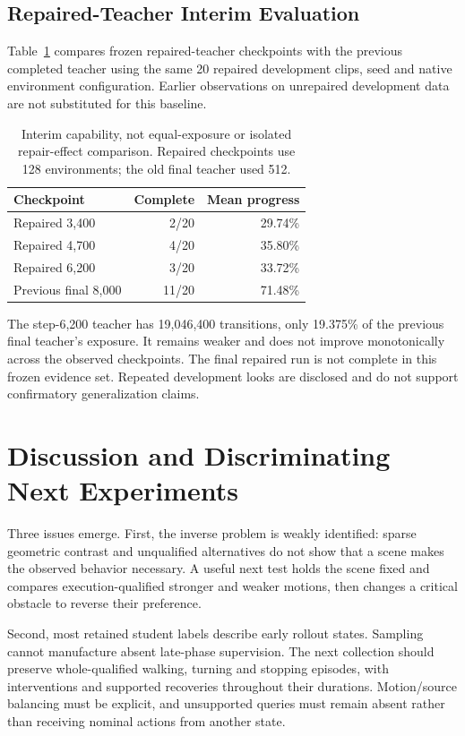 \documentclass[10pt,twocolumn]{article}
\begin{document}
\subsection{Repaired-Teacher Interim Evaluation}
Table~\ref{tab:teacher} compares frozen repaired-teacher checkpoints with the previous completed teacher using the same 20 repaired development clips, seed and native environment configuration. Earlier observations on unrepaired development data are not substituted for this baseline.
\begin{table}[t]
\centering\small
\begin{tabular}{lrr}\toprule
Checkpoint & Complete & Mean progress\\\midrule
Repaired 3,400 & 2/20 & 29.74\%\\
Repaired 4,700 & 4/20 & 35.80\%\\
Repaired 6,200 & 3/20 & 33.72\%\\
Previous final 8,000 & 11/20 & 71.48\%\\\bottomrule
\end{tabular}
\caption{Interim capability, not equal-exposure or isolated repair-effect comparison. Repaired checkpoints use 128 environments; the old final teacher used 512.}\label{tab:teacher}
\end{table}
The step-6,200 teacher has 19,046,400 transitions, only 19.375\% of the previous final teacher's exposure. It remains weaker and does not improve monotonically across the observed checkpoints. The final repaired run is not complete in this frozen evidence set. Repeated development looks are disclosed and do not support confirmatory generalization claims.

\section{Discussion and Discriminating Next Experiments}
Three issues emerge. First, the inverse problem is weakly identified: sparse geometric contrast and unqualified alternatives do not show that a scene makes the observed behavior necessary. A useful next test holds the scene fixed and compares execution-qualified stronger and weaker motions, then changes a critical obstacle to reverse their preference.

Second, most retained student labels describe early rollout states. Sampling cannot manufacture absent late-phase supervision. The next collection should preserve whole-qualified walking, turning and stopping episodes, with interventions and supported recoveries throughout their durations. Motion/source balancing must be explicit, and unsupported queries must remain absent rather than receiving nominal actions from another state.
\end{document}
